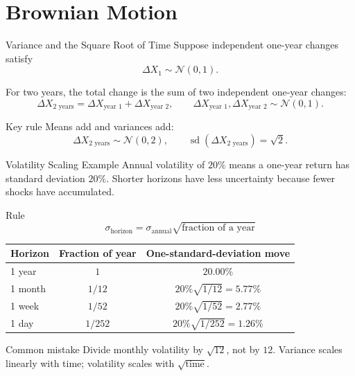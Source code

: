 \documentclass[aspectratio=169,11pt]{beamer}
\newcommand{\Normal}{\mathcal{N}}
\begin{document}
\section{Brownian Motion}

\begin{frame}[label=variance_scaling_main]{Variance and the Square Root of Time}
    Suppose independent one-year changes satisfy
    \[
        \Delta X_1\sim\Normal(0,1).
    \]

    For two years, the total change is the sum of two independent one-year changes:
    \[
        \Delta X_{\text{2 years}}
        =
        \Delta X_{\text{year 1}}
        +
        \Delta X_{\text{year 2}},
        \qquad
        \Delta X_{\text{year 1}},\Delta X_{\text{year 2}}
        \sim\Normal(0,1).
    \]

    \begin{block}{Key rule}
        Means add and variances add:
        \[
            \Delta X_{\text{2 years}}\sim\Normal(0,2),
            \qquad
            \operatorname{sd}(\Delta X_{\text{2 years}})=\sqrt{2}.
        \]
    \end{block}

    \hyperlink{deriv_variance_scaling}{}
\end{frame}

\begin{frame}{Volatility Scaling Example}
    \small
    Annual volatility of \(20\%\) means a one-year return has standard deviation \(20\%\).
    Shorter horizons have less uncertainty because fewer shocks have accumulated.

    \begin{block}{Rule}
        \[
            \sigma_{\text{horizon}}
            =
            \sigma_{\text{annual}}\sqrt{\text{fraction of a year}}
        \]
    \end{block}

    \begin{center}
        \footnotesize
        \begin{tabular}{lcc}
            \toprule
            Horizon & Fraction of year & One-standard-deviation move \\
            \midrule
            1 year  & \(1\)          & \(20.00\%\) \\
            1 month & \(1/12\)       & \(20\%\sqrt{1/12}=5.77\%\) \\
            1 week  & \(1/52\)       & \(20\%\sqrt{1/52}=2.77\%\) \\
            1 day   & \(1/252\)      & \(20\%\sqrt{1/252}=1.26\%\) \\
            \bottomrule
        \end{tabular}
    \end{center}

    \begin{alertblock}{Common mistake}
        Divide monthly volatility by \(\sqrt{12}\), not by \(12\).
        Variance scales linearly with time; volatility scales with \(\sqrt{\text{time}}\).
    \end{alertblock}
\end{frame}
\end{document}
